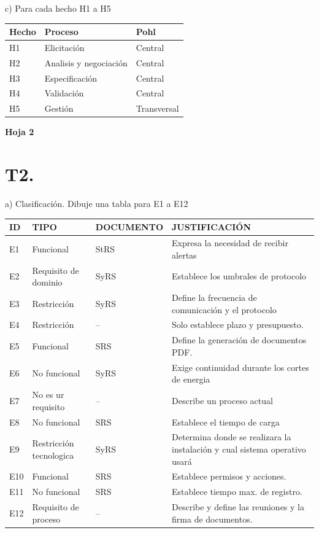 \documentclass[conference,onecolumn]{IEEEtran}
\begin{document}
\medskip
\noindent c) Para cada hecho H1 a H5

\begin{table}[H]
\centering
\begin{tabular}{@{}lll@{}}
\toprule
\textbf{Hecho} & \textbf{Proceso} & \textbf{Pohl}\\
\midrule
H1 & Elicitación & Central\\
H2 & Analisis y negociación & Central\\
H3 & Especificación & Central\\
H4 & Validación & Central\\
H5 & Gestión & Transversal\\
\bottomrule
\end{tabular}
\end{table}

\noindent\textbf{Hoja 2}

\section*{T2.}

\noindent a) Clasificación. Dibuje una tabla para E1 a E12

{\small
\begin{longtable}{@{}L{0.06\textwidth}L{0.24\textwidth}L{0.16\textwidth}L{0.46\textwidth}@{}}
\toprule
\textbf{ID} & \textbf{TIPO} & \textbf{DOCUMENTO} & \textbf{JUSTIFICACIÓN}\\
\midrule
\endhead
E1 & Funcional & StRS & Expresa la necesidad de recibir alertas\\
E2 & Requisito de dominio & SyRS & Establece los umbrales de protocolo\\
E3 & Restricción & SyRS & Define la frecuencia de comunicación y el protocolo\\
E4 & Restricción & -- & Solo establece plazo y presupuesto.\\
E5 & Funcional & SRS & Define la generación de documentos PDF.\\
E6 & No funcional & SyRS & Exige continuidad durante los cortes de energia\\
E7 & No es ur requisito & -- & Describe un proceso actual\\
E8 & No funcional & SRS & Establece el tiempo de carga\\
E9 & Restricción tecnologica & SyRS & Determina donde se realizara la instalación y cual sistema operativo usará\\
E10 & Funcional & SRS & Establece permisos y acciones.\\
E11 & No funcional & SRS & Establece tiempo max. de registro.\\
E12 & Requisito de proceso & -- & Describe y define las reuniones y la firma de documentos.\\
\bottomrule
\end{longtable}
}
\end{document}
